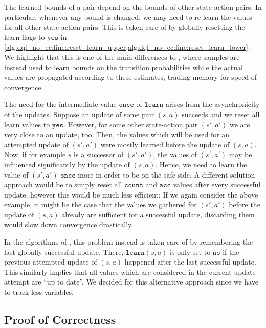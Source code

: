 \documentclass{theoretics}
\newcommand{\acc}{\texttt{acc}}
\newcommand{\visitcount}{\texttt{count}}
\newcommand{\learn}{\texttt{learn}}
\newcommand{\learnyes}{\texttt{yes}}
\newcommand{\learnonce}{\texttt{once}}
\newcommand{\learnno}{\texttt{no}}
\begin{document}
The learned bounds of a pair depend on the bounds of other state-action pairs.
In particular, whenever any bound is changed, we may need to re-learn the values for all other state-action pairs.
This is taken care of by globally resetting the learn flags to $\learnyes$ in \cref{alg:dql_no_ec:line:reset_learn_upper,alg:dql_no_ec:line:reset_learn_lower}.
We highlight that this is one of the main differences to \cite{DBLP:conf/cav/AshokKW19}, where samples are instead used to learn bounds on the transition probabilities while the actual values are propagated according to these estimates, trading memory for speed of convergence.

The need for the intermediate value $\learnonce$ of $\learn$ arises from the asynchronicity of the updates.
Suppose an update of some pair $(s, a)$ succeeds and we reset all learn values to $\learnyes$.
However, for some other state-action pair $(s', a')$ we are very close to an update, too.
Then, the values which will be used for an attempted update of $(s', a')$ were mostly learned before the update of $(s, a)$.
Now, if for example $s$ is a successor of $(s', a')$, the values of $(s', a')$ may be influenced significantly by the update of $(s, a)$.
Hence, we need to learn the value of $(s', a')$ $\learnonce$ more in order to be on the safe side.
A different solution approach would be to simply reset all $\visitcount$ and $\acc$ values after every successful update, however this would be much less efficient:
If we again consider the above example, it might be the case that the values we gathered for $(s', a')$ before the update of $(s, a)$ already are sufficient for a successful update, discarding them would slow down convergence drastically.

In the algorithms of \cite{DBLP:conf/icml/StrehlLWLL06,DBLP:conf/atva/BrazdilCCFKKPU14}, this problem instead is taken care of by remembering the last globally successful update.
There, $\learn(s, a)$ is only set to $\learnno$ if the previous attempted update of $(s, a)$ happened after the last successful update.
This similarly implies that all values which are considered in the current update attempt are \enquote{up to date}.
We decided for this alternative approach since we have to track less variables.


\subsection{Proof of Correctness}
\end{document}
